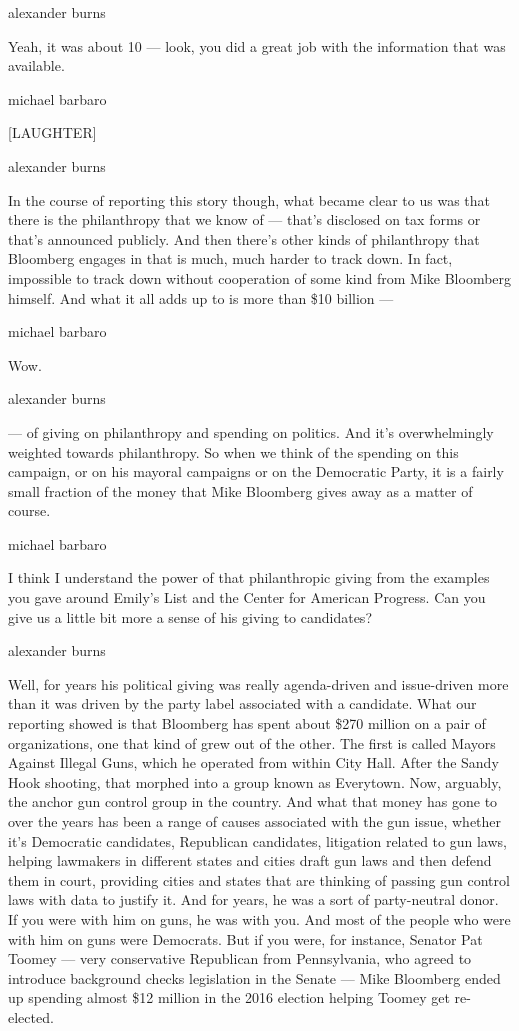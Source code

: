 alexander burns

Yeah, it was about 10 --- look, you did a great job with the information
that was available.

michael barbaro

{[}LAUGHTER{]}

alexander burns

In the course of reporting this story though, what became clear to us
was that there is the philanthropy that we know of --- that's disclosed
on tax forms or that's announced publicly. And then there's other kinds
of philanthropy that Bloomberg engages in that is much, much harder to
track down. In fact, impossible to track down without cooperation of
some kind from Mike Bloomberg himself. And what it all adds up to is
more than \$10 billion ---

michael barbaro

Wow.

alexander burns

--- of giving on philanthropy and spending on politics. And it's
overwhelmingly weighted towards philanthropy. So when we think of the
spending on this campaign, or on his mayoral campaigns or on the
Democratic Party, it is a fairly small fraction of the money that Mike
Bloomberg gives away as a matter of course.

michael barbaro

I think I understand the power of that philanthropic giving from the
examples you gave around Emily's List and the Center for American
Progress. Can you give us a little bit more a sense of his giving to
candidates?

alexander burns

Well, for years his political giving was really agenda-driven and
issue-driven more than it was driven by the party label associated with
a candidate. What our reporting showed is that Bloomberg has spent about
\$270 million on a pair of organizations, one that kind of grew out of
the other. The first is called Mayors Against Illegal Guns, which he
operated from within City Hall. After the Sandy Hook shooting, that
morphed into a group known as Everytown. Now, arguably, the anchor gun
control group in the country. And what that money has gone to over the
years has been a range of causes associated with the gun issue, whether
it's Democratic candidates, Republican candidates, litigation related to
gun laws, helping lawmakers in different states and cities draft gun
laws and then defend them in court, providing cities and states that are
thinking of passing gun control laws with data to justify it. And for
years, he was a sort of party-neutral donor. If you were with him on
guns, he was with you. And most of the people who were with him on guns
were Democrats. But if you were, for instance, Senator Pat Toomey ---
very conservative Republican from Pennsylvania, who agreed to introduce
background checks legislation in the Senate --- Mike Bloomberg ended up
spending almost \$12 million in the 2016 election helping Toomey get
re-elected.

